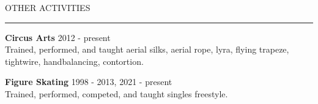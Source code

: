 \documentclass{resume} %
\renewenvironment{rSection}[1]{
\sectionskip
\textcolor{RoyalPurple}{\MakeUppercase{#1}}
\sectionlineskip
\hrule
\begin{list}{}{
\setlength{\leftmargin}{1.5em}
}
\item[]
}{
\end{list}
}
\begin{document}


\begin{rSection}{Other Activities}

{\bf Circus Arts} \hfill 2012 - present \\ 
Trained, performed, and taught aerial silks, aerial rope, lyra, flying trapeze, tightwire, handbalancing, contortion.

{\bf Figure Skating} \hfill 1998 - 2013, 2021 - present \\ 
Trained, performed, competed, and taught singles freestyle.

\end{rSection}
\end{document}

